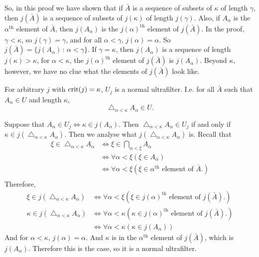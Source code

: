 \documentclass{article}
\begin{document}
\newlec So, in this proof we have shown that if $\bar{A}$ is a sequence of subsets of $\kappa$ of length $\gamma$, then $j(\bar{A})$ is a sequence of subsets of $j(\kappa)$ of length $j(\gamma)$. Also, if $A_{\alpha}$ is the $\alpha^{\text{th}}$ element of $\bar{A}$, then $j(A_{\alpha})$ is the $j(\alpha)^{\text{th}}$ element of $j(\bar{A})$. In the proof, $\gamma < \kappa$, so $j(\gamma) = \gamma$, and for all $\alpha < \gamma$, $j(\alpha)=\alpha$. So $j(\bar{A})= \{j(A_{\alpha}) \, : \, \alpha < \gamma\}$.\gap 
If $\gamma = \kappa$, then $j(A_{\alpha})$ is a sequence of length $j(\kappa)>\kappa$, for $\alpha < \kappa$, the $j(\alpha)^{\text{th}}$ element of $j(\bar{A})$ is $j(A_{\alpha})$. Beyond $\kappa$, however, we have no clue what the elements of $j(\bar{A})$ look like.
\begin{fancyprop}{}
    For arbitrary $j$ with $\operatorname{crit}(j)=\kappa$, $U_{j}$ is a normal ultrafilter. I.e. for all $\bar{A}$ such that $A_{\alpha} \in U$ and length $\kappa$, \[\bigtriangleup_{\alpha < \kappa} A_{\alpha} \in U.\]
\end{fancyprop}
\proof Suppose that $A_{\alpha} \in U_{j} \Leftrightarrow \kappa \in j(A_{\alpha})$. Then $\bigtriangleup_{\alpha<\kappa} A_{\alpha} \in U_{j}$ if and only if $\kappa \in j\left(\bigtriangleup_{\alpha<\kappa} A_{\alpha} \right)$.\gap 
Then we analyse what $j\left(\bigtriangleup_{\alpha<\kappa} A_{\alpha}\right)$ is. Recall that  
\begin{align*}
    \xi \in \bigtriangleup_{\alpha<\kappa} A_{\alpha} &\Leftrightarrow \xi \in \bigcap_{\alpha < \xi} A_{\alpha}\\
    &\Leftrightarrow \forall \alpha < \xi (\xi \in A_{\alpha})\\
    &\Leftrightarrow \forall \alpha < \xi (\xi \in \alpha^{\text{th}} \text{ element of $\bar{A}$.})\\
\end{align*}
Therefore,
\begin{align*}
    \xi \in j \left(\bigtriangleup_{\alpha < \kappa} A_{\alpha}\right) &\Leftrightarrow \forall \alpha < \xi (\xi \in j(\alpha)^{\text{th}} \text{ element of $j(\bar{A})$.})\\
    \kappa\in j \left(\bigtriangleup_{\alpha < \kappa} A_{\alpha}\right) &\Leftrightarrow \forall \alpha < \kappa (\kappa \in j(\alpha)^{\text{th}} \text{ element of $j(\bar{A})$.})\\
    &\Leftrightarrow \forall \alpha < \kappa ( \kappa \in j(A_{\alpha}))
\end{align*}
And for $\alpha < \kappa$, $j(\alpha)=\alpha$. And $\kappa$ is in the $\alpha^{\text{th}}$ element of $j(\bar{A})$, which is $j(A_{\alpha})$. Therefore this is the case, so it is a normal ultrafilter. \endproof
\end{document}
